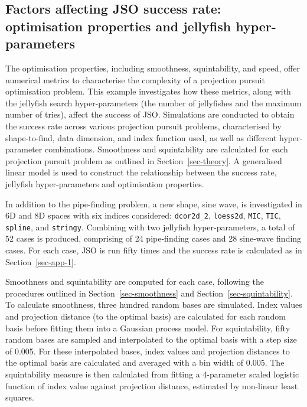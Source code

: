 \documentclass[
  number,
  preprint,
  3p]{elsarticle}
\begin{document}
\subsection{Factors affecting JSO success rate: optimisation properties
and jellyfish hyper-parameters}\label{sec-app-2}

The optimisation properties, including smoothness, squintability, and
speed, offer numerical metrics to characterise the complexity of a
projection pursuit optimisation problem. This example investigates how
these metrics, along with the jellyfish search hyper-parameters (the
number of jellyfishes and the maximum number of tries), affect the
success of JSO. Simulations are conducted to obtain the success rate
across various projection pursuit problems, characterised by
shape-to-find, data dimension, and index function used, as well as
different hyper-parameter combinations. Smoothness and squintability are
calculated for each projection pursuit problem as outlined in
Section~\ref{sec-theory}. A generalised linear model is used to
construct the relationship between the success rate, jellyfish
hyper-parameters and optimisation properties.

In addition to the pipe-finding problem, a new shape, sine wave, is
investigated in 6D and 8D spaces with six indices considered:
\texttt{dcor2d\_2}, \texttt{loess2d}, \texttt{MIC}, \texttt{TIC},
\texttt{spline}, and \texttt{stringy}. Combining with two jellyfish
hyper-parameters, a total of 52 cases is produced, comprising of 24
pipe-finding cases and 28 sine-wave finding cases. For each case, JSO is
run fifty times and the success rate is calculated as in
Section~\ref{sec-app-1}.

Smoothness and squintability are computed for each case, following the
procedures outlined in Section~\ref{sec-smoothness} and
Section~\ref{sec-squintability}. To calculate smoothness, three hundred
random bases are simulated. Index values and projection distance (to the
optimal basis) are calculated for each random basis before fitting them
into a Gaussian process model. For squintability, fifty random bases are
sampled and interpolated to the optimal basis with a step size of 0.005.
For these interpolated bases, index values and projection distances to
the optimal basis are calculated and averaged with a bin width of 0.005.
The squintability measure is then calculated from fitting a 4-parameter
scaled logistic function of index value against projection distance,
estimated by non-linear least squares.
\end{document}
